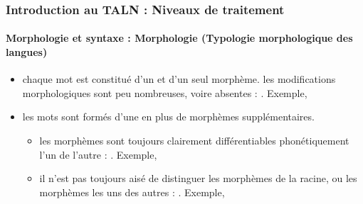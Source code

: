 \documentclass[xcolor=table]{beamer}
\begin{document}
\begin{frame}
\frametitle{Introduction au TALN : Niveaux de traitement}
\framesubtitle{Morphologie et syntaxe : Morphologie (Typologie morphologique des langues)}

\begin{itemize}
	\item {} chaque mot est constitué d'un et d'un seul morphème. les modifications morphologiques sont peu nombreuses, voire absentes : . Exemple, 
	\item {} les mots sont formés d'une  en plus de morphèmes supplémentaires.
	\begin{itemize}
		\item {} les morphèmes sont toujours clairement différentiables phonétiquement l'un de l'autre : . Exemple,  
		\item {} il n'est pas toujours aisé de distinguer les morphèmes de la racine, ou les morphèmes les uns des autres : . Exemple, 
	\end{itemize}
\end{itemize}

\end{frame}
\end{document}
